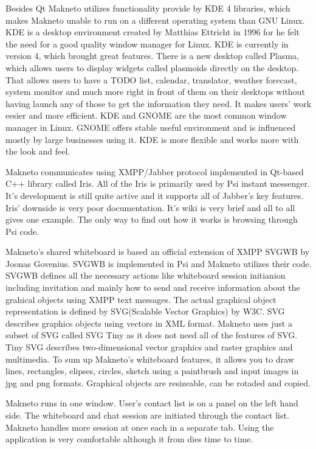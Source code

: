 Besides Qt Makneto utilizes functionality provide by KDE 4\cite{KDE} libraries, which makes Makneto unable to run on a different operating system than GNU Linux. KDE is a desktop environment created by Matthias Ettricht in 1996 for he felt the need for a good quality window manager for Linux. KDE is currently in version 4, which brought great features. There is a new desktop called Plasma, which allows users to display widgets called plasmoids directly on the desktop. That allows users to have a TODO list, calendar, translator, weather forecast, system monitor and much more right in front of them on their desktops without having launch any of those to get the information they need. It makes users' work eesier and more efficient. KDE and GNOME are the most common window manager in Linux. GNOME offers stable useful environment and is influenced mostly by large businesses using it. KDE is more flexible and works more with the look and feel.

Makneto communicates using XMPP/Jabber protocol implemented in Qt-based C++ library called Iris. All of the Iris is primarily used by Psi instant messenger. It's development is still quite active and it supports all of Jabber's key features. Iris' downside is very poor documentation. It's wiki is very brief and all to all gives one example. The only way to find out how it works is browsing through Psi code.\cite{irisWiki}

Makneto's shared whiteboard is based an official extension of XMPP SVGWB by Joonas Govenius\cite{SVGWB}. SVGWB is implemented in Psi and Makneto utilizes their code. SVGWB defines all the necessary actions like whiteboard session initianion including invitation and mainly how to send and receive information about the grahical objects using XMPP text messages. The actual graphical object representation is defined by SVG\cite{SVG}(Scalable Vector Graphics) by W3C. SVG describes graphics objects using vectors in XML format. Makneto uses just a subset of SVG called SVG Tiny\cite{SVGtiny} as it does not need all of the features of SVG. Tiny SVG describes two-dimensional vector graphics and raster graphics and multimedia. To sum up Makneto's whiteboard features, it allows you to draw lines, rectangles, elipses, circles, sketch using a paintbrush and input images in jpg and png formats. Graphical objects are resizeable, can be rotaded and copied.  


Makneto runs in one window. User's contact list is on a panel on the left hand side. The whiteboard and chat session are initiated through the contact list. Makneto handles more session at once each in a separate tab. Using the application is very comfortable although it from dies time to time.

